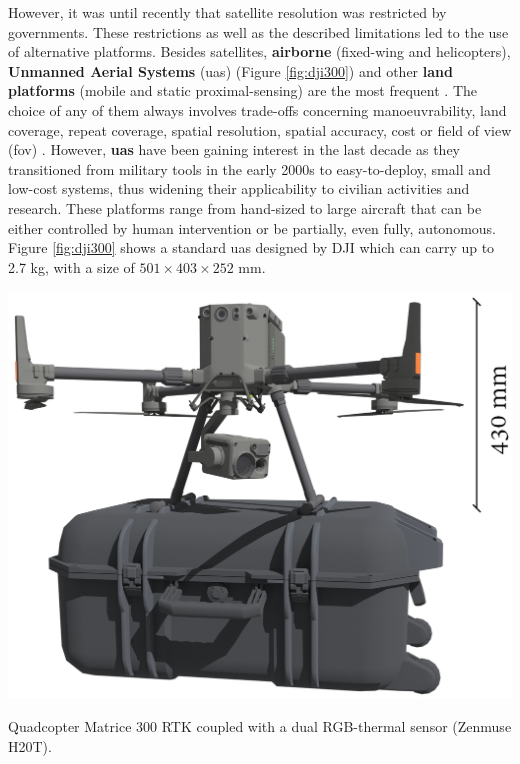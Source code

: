 However, it was until recently that satellite resolution was restricted by governments. These restrictions as well as the described limitations led to the use of alternative platforms. Besides satellites, \textbf{airborne} (fixed-wing and helicopters), \textbf{Unmanned Aerial Systems} (\acrshort{uas}) (Figure \ref{fig:dji300}) and other \textbf{land platforms} (mobile and static proximal-sensing) are the most frequent \cite{lillesand_remote_2015}. The choice of any of them always involves trade-offs concerning manoeuvrability, land coverage, repeat coverage, spatial resolution, spatial accuracy, cost or field of view (\acrshort{fov}) \cite{toth_remote_2016}. However, \textbf{\acrshort{uas}} have been gaining interest in the last decade as they transitioned from military tools in the early 2000s to easy-to-deploy, small and low-cost systems, thus widening their applicability to civilian activities and research. These platforms range from hand-sized to large aircraft that can be either controlled by human intervention or be partially, even fully, autonomous. Figure \ref{fig:dji300} shows a standard \acrshort{uas} designed by DJI which can carry up to 2.7 \si{\kilo\gram}, with a size of $501 \times 403 \times 252$ \si{\milli\meter}.
\begin{marginfigure}[-3cm]
	\includegraphics{figs/introduction/dji300.png}
	\caption{Quadcopter Matrice 300 RTK coupled with a dual RGB-thermal sensor (Zenmuse H20T). }
	\label{fig:dji300}
\end{marginfigure}

